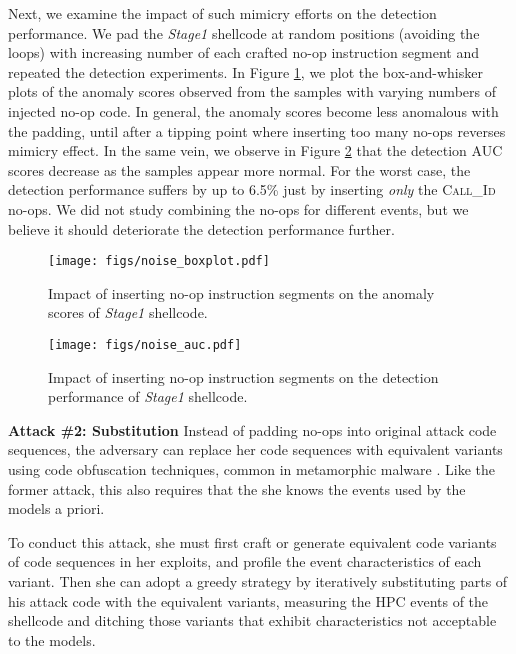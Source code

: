 \documentclass{acm_proc_article-sp}
\begin{document}
Next, we examine the impact of such mimicry efforts on the detection performance. We pad the \textit{Stage1} shellcode at random positions (avoiding the loops) with increasing number of each crafted no-op instruction segment and repeated the detection experiments. In Figure \ref{fig:noise_boxplot}, we plot the box-and-whisker plots of the anomaly scores observed from the samples with varying numbers of injected no-op code. In general, the anomaly scores become less anomalous with the padding, until after a tipping point where inserting too many no-ops reverses mimicry effect. In the same vein, we observe in Figure \ref{fig:noise_auc} that the detection AUC scores decrease as the samples appear more normal. For the worst case, the detection performance suffers by up to 6.5\% just by inserting \textit{only} the \textsc{Call\_Id} no-ops. We did not study combining the no-ops for different events, but we believe it should deteriorate the detection performance further.

\begin{figure}
	  \centering
	  \texttt{[image: figs/noise\_boxplot.pdf]}
 	 \caption{Impact of inserting no-op instruction segments on the anomaly scores of \textit{Stage1} shellcode.}
	 \label{fig:noise_boxplot}
\end{figure}

\begin{figure}
	  \centering
	  \texttt{[image: figs/noise\_auc.pdf]}
 	 \caption{Impact of inserting no-op instruction segments on the detection performance of \textit{Stage1} shellcode.}
	 \label{fig:noise_auc}
\end{figure}

\textbf{Attack \#2: Substitution} \space\space Instead of padding no-ops into original attack code sequences, the adversary can replace her code sequences with equivalent variants using code obfuscation techniques, common in  metamorphic malware \cite{borello:2008}. Like the former attack, this also requires that the she knows the events used by the models a priori.

To conduct this attack, she must first craft or generate equivalent code variants of code sequences in her exploits, and profile the event characteristics of each variant. Then she can adopt a greedy strategy by iteratively substituting parts of his attack code with the equivalent variants, measuring the HPC events of the shellcode and ditching those variants that exhibit characteristics not acceptable to the models.
\end{document}
